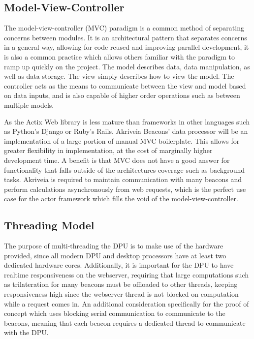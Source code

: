 \subsection{Model-View-Controller}
\medskip
The model-view-controller (MVC) paradigm is a common method of separating concerns between modules.
It is an architectural pattern that separates concerns in a general way, allowing for code reused and improving parallel development, it is also a common practice which allows others familiar with the paradigm to ramp up quickly on the project.
The model describes data, data manipulation, as well as data storage.
The view simply describes how to view the model.
The controller acts as the means to communicate between the view and model based on data inputs, and is also capable of higher order operations such as between multiple models.

\bigskip
As the Actix Web library is less mature than frameworks in other languages such as Python's Django or Ruby's Rails. Akriveia Beacons' data processor will be an implementation of a large portion of manual MVC boilerplate.
This allows for greater flexibility in implementation, at the cost of marginally higher development time.
A benefit is that MVC does not have a good answer for functionality that falls outside of the architectures coverage such as background tasks.
Akriveia is required to maintain communication with many beacons and perform calculations asynchronously from web requests, which is the perfect use case for the actor framework which fills the void of the model-view-controller.


\bigskip
\pagebreak
\subsection{Threading Model}
\medskip
The purpose of multi-threading the DPU is to make use of the hardware provided, since all modern DPU and desktop processors have at least two dedicated hardware cores.
Additionally, it is important for the DPU to have realtime responsiveness on the webserver, requiring that large computations such as trilateration for many beacons must be offloaded to other threads, keeping responsiveness high since the webserver thread is not blocked on computation while a request comes in. An additional consideration specifically for the proof of concept which uses blocking serial communication to communicate to the beacons, meaning that each beacon requires a dedicated thread to communicate with the DPU.

